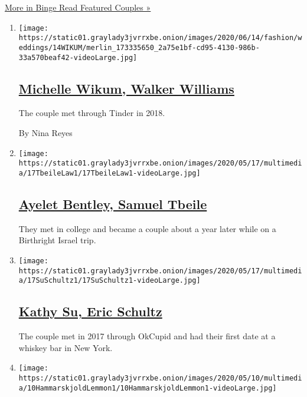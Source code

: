 \href{/spotlight/wedding-announcements}{More in Binge Read Featured
Couples »}

\begin{enumerate}
\def\labelenumi{\arabic{enumi}.}
\item
  \texttt{[image: https://static01.graylady3jvrrxbe.onion/images/2020/06/14/fashion/weddings/14WIKUM/merlin\_173335650\_2a75e1bf-cd95-4130-986b-33a570beaf42-videoLarge.jpg]}

  \hypertarget{michelle-wikum-walker-williams}{%
  \subsection{\texorpdfstring{\href{/2020/06/14/fashion/weddings/michelle-wikum-walker-williams.html}{Michelle
  Wikum, Walker
  Williams}}{Michelle Wikum, Walker Williams}}\label{michelle-wikum-walker-williams}}

  The couple met through Tinder in 2018.

  By Nina Reyes
\item
  \texttt{[image: https://static01.graylady3jvrrxbe.onion/images/2020/05/17/multimedia/17TbeileLaw1/17TbeileLaw1-videoLarge.jpg]}

  \hypertarget{ayelet-bentley-samuel-tbeile}{%
  \subsection{\texorpdfstring{\href{/2020/05/17/fashion/weddings/ayelet-bentley-samuel-tbeile.html}{Ayelet
  Bentley, Samuel
  Tbeile}}{Ayelet Bentley, Samuel Tbeile}}\label{ayelet-bentley-samuel-tbeile}}

  They met in college and became a couple about a year later while on a
  Birthright Israel trip.
\item
  \texttt{[image: https://static01.graylady3jvrrxbe.onion/images/2020/05/17/multimedia/17SuSchultz1/17SuSchultz1-videoLarge.jpg]}

  \hypertarget{kathy-su-eric-schultz}{%
  \subsection{\texorpdfstring{\href{/2020/05/17/fashion/weddings/kathy-su-eric-schultz.html}{Kathy
  Su, Eric
  Schultz}}{Kathy Su, Eric Schultz}}\label{kathy-su-eric-schultz}}

  The couple met in 2017 through OkCupid and had their first date at a
  whiskey bar in New York.
\item
  \texttt{[image: https://static01.graylady3jvrrxbe.onion/images/2020/05/10/multimedia/10HammarskjoldLemmon1/10HammarskjoldLemmon1-videoLarge.jpg]}


\end{enumerate}
